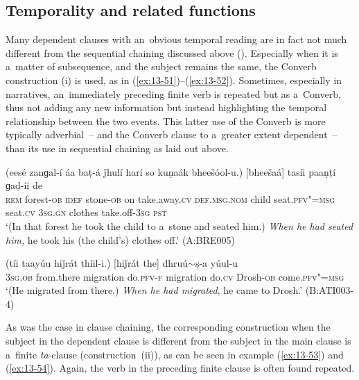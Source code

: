 \subsection{Temporality and related functions}
\label{subsec:13-4-1}

 Many dependent clauses with an~obvious temporal reading are in fact not much different from the sequential chaining discussed above (). Especially when it is a~matter of subsequence, and the subject remains the same, the Converb construction (i) is used, as in (\ref{ex:13-51})--(\ref{ex:13-52}). Sometimes, especially in narratives, an~immediately preceding finite verb is repeated but as a~Converb, thus not adding any new information but instead highlighting the temporal relationship between the two events. This latter use of the Converb is more typically adverbial~-- and the Converb clause to a~greater extent dependent~-- than its use in sequential chaining as laid out above.

\begin{exe}
\ex
\label{ex:13-51}
\gll (eesé zanɡal-í áa baṭ-á ǰhulí harí so kuṇaák bheešóol-u.) [bheešaá] tasíi paaṇṭí ɡaḍ-íi de \\
\textsc{rem} forest-\textsc{ob} \textsc{idef} stone-\textsc{ob} on take.away.\textsc{cv}   \textsc{def.msg.nom} child seat.\textsc{pfv"=msg} seat.\textsc{cv} \textsc{3sg.gn} clothes take.off-\textsc{3sg} \textsc{pst} \\
\glt `(In that forest he took the child to a~stone and seated him.) \textit{When he had seated him,} he took his (the child's) clothes off.' (A:BRE005)

\ex
\label{ex:13-52}
\gll (tíi taayúu hiǰrát thíil-i.) [hiǰrát the] dhruú$\sim$ṣ-a yúul-u \\
\textsc{3sg.ob} from.there migration do.\textsc{pfv-f}    migration do.\textsc{cv} Drosh-\textsc{ob} come.\textsc{pfv"=msg} \\
\glt `(He migrated from there.) \textit{When he had migrated}, he came to Drosh.' (B:ATI003-4) 
\end{exe}

As was the case in clause chaining, the corresponding construction when the subject in the dependent
clause is different from the subject in the main clause is a~finite \textit{ta}-clause
(construction~(ii)), as can be seen in example (\ref{ex:13-53}) and (\ref{ex:13-54}). Again, the verb in the preceding finite clause is often found repeated.

